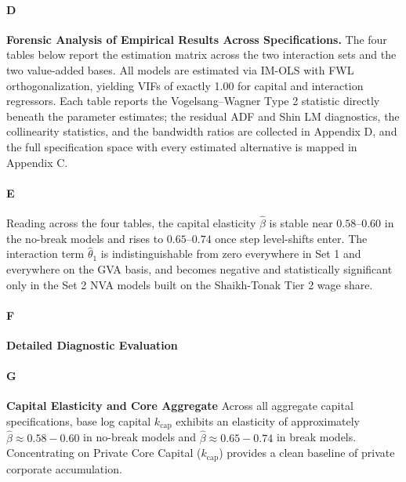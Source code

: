 \paragraph{D}
\textbf{Forensic Analysis of Empirical Results Across Specifications.} The four tables below report the estimation matrix across the two interaction sets and the two value-added bases. All models are estimated via IM-OLS with FWL orthogonalization, yielding VIFs of exactly 1.00 for capital and interaction regressors. Each table reports the Vogelsang--Wagner Type 2 statistic directly beneath the parameter estimates; the residual ADF and Shin LM diagnostics, the collinearity statistics, and the bandwidth ratios are collected in Appendix D, and the full specification space with every estimated alternative is mapped in Appendix C.









\paragraph{E}
Reading across the four tables, the capital elasticity $\hat{\beta}$ is stable near $0.58$--$0.60$ in the no-break models and rises to $0.65$--$0.74$ once step level-shifts enter. The interaction term $\hat{\theta}_1$ is indistinguishable from zero everywhere in Set 1 and everywhere on the GVA basis, and becomes negative and statistically significant only in the Set 2 NVA models built on the Shaikh-Tonak Tier 2 wage share.

\paragraph{F}
\textbf{Detailed Diagnostic Evaluation}

\paragraph{G}
\textbf{Capital Elasticity and Core Aggregate}
Across all aggregate capital specifications, base log capital $k_{\text{cap}}$ exhibits an elasticity of approximately $\hat{\beta} \approx 0.58 - 0.60$ in no-break models and $\hat{\beta} \approx 0.65 - 0.74$ in break models. Concentrating on Private Core Capital ($k_{\text{cap}}$) provides a clean baseline of private corporate accumulation.

